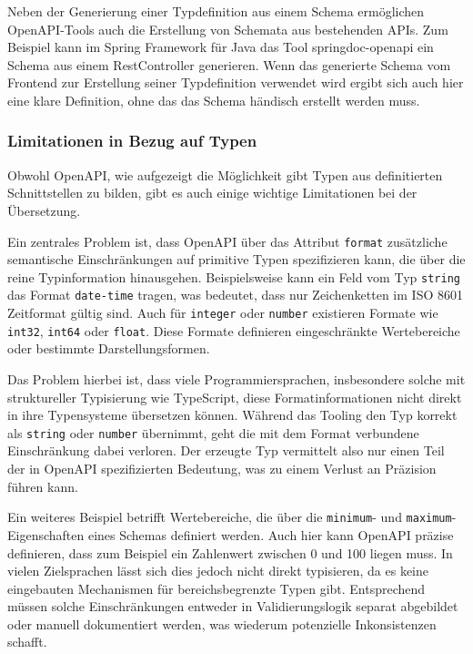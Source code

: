 Neben der Generierung einer Typdefinition aus einem Schema ermöglichen OpenAPI-Tools auch die Erstellung von
Schemata aus bestehenden APIs.\cite{lercher2024generatingaccurateopenapidescriptions}\cite{dos2020analysis}
Zum Beispiel kann im Spring Framework für Java das Tool springdoc-openapi ein Schema aus einem 
RestController generieren.
Wenn das generierte Schema vom Frontend zur Erstellung seiner Typdefinition verwendet wird ergibt sich auch
hier eine klare Definition, ohne das das Schema händisch erstellt werden muss.

\subsubsection{Limitationen in Bezug auf Typen}

Obwohl OpenAPI, wie aufgezeigt die Möglichkeit gibt Typen aus definitierten Schnittstellen zu bilden, 
gibt es auch einige wichtige Limitationen bei der Übersetzung.

Ein zentrales Problem ist, dass OpenAPI über das Attribut \texttt{format} zusätzliche semantische Einschränkungen
auf primitive Typen spezifizieren kann, die über die reine Typinformation hinausgehen.
Beispielsweise kann ein Feld vom Typ \texttt{string} das Format \texttt{date-time} tragen, 
was bedeutet, dass nur Zeichenketten im ISO 8601 Zeitformat gültig sind. 
Auch für \texttt{integer} oder \texttt{number} existieren Formate wie 
\texttt{int32}, \texttt{int64} oder \texttt{float}. 
Diese Formate definieren eingeschränkte Wertebereiche oder bestimmte Darstellungsformen.\cite{OpenApiSpec}

Das Problem hierbei ist, dass viele Programmiersprachen, insbesondere solche mit struktureller Typisierung wie TypeScript,
diese Formatinformationen nicht direkt in ihre Typensysteme übersetzen können. 
Während das Tooling den Typ korrekt als \texttt{string} oder \texttt{number} übernimmt, 
geht die mit dem Format verbundene Einschränkung dabei verloren. 
Der erzeugte Typ vermittelt also nur einen Teil der in OpenAPI spezifizierten Bedeutung, 
was zu einem Verlust an Präzision führen kann.\cite{OpenAPITypeScript}

Ein weiteres Beispiel betrifft Wertebereiche, 
die über die \texttt{minimum}- und \texttt{maximum}-Eigenschaften eines Schemas definiert werden.
Auch hier kann OpenAPI präzise definieren, dass zum Beispiel ein Zahlenwert zwischen 0 und 100 liegen muss. 
In vielen Zielsprachen lässt sich dies jedoch nicht direkt typisieren, 
da es keine eingebauten Mechanismen für bereichsbegrenzte Typen gibt.
Entsprechend müssen solche Einschränkungen entweder in Validierungslogik separat abgebildet oder manuell dokumentiert werden,
was wiederum potenzielle Inkonsistenzen schafft.

